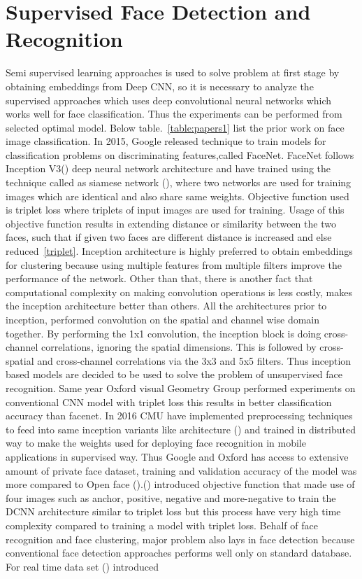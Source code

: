 \documentclass[a4paper,12pt, twoside]{NITKReport}
\begin{document}
\section{Supervised Face Detection and Recognition}
\par Semi supervised learning approaches is used to solve problem at first stage by obtaining embeddings from Deep CNN, so it is necessary to analyze the supervised approaches which uses deep convolutional neural networks which works well for face classification. Thus the experiments can be performed from selected optimal model. Below table.~\ref{table:papers1} list the prior work on face image classification. In 2015, Google released technique to train models for classification problems on discriminating features,called FaceNet. FaceNet follows Inception V3(\cite{DBLP:journals/corr/SzegedyVISW15}) deep neural network architecture and have trained using the technique called as siamese network (\cite{Koch2015SiameseNN}), where two networks are used for training images which are identical and also share same weights. Objective function used is triplet loss where triplets of input images are used for training. Usage of this objective function results in extending distance or similarity between the two faces, such that if given two faces are different distance is increased and else reduced~\ref{triplet}. Inception architecture is highly preferred to obtain embeddings for clustering because using multiple features from multiple filters improve the performance of the network. Other than that, there is another fact that computational complexity on making convolution operations is less costly, makes the inception architecture better than others. All the architectures prior to inception, performed convolution on the spatial and channel wise domain together. By performing the 1x1 convolution, the inception block is doing cross-channel correlations, ignoring the spatial dimensions. This is followed by cross-spatial and cross-channel correlations via the 3x3 and 5x5 filters. Thus inception based models are decided to be used to solve the problem of unsupervised face recognition. Same year Oxford visual Geometry Group performed experiments on conventional CNN model with triplet loss this results in better classification accuracy than facenet. In 2016 CMU have implemented preprocessing techniques to feed into same inception variants like architecture (\cite{amos2016openface}) and trained in distributed way to make the weights used for deploying face recognition in mobile applications in supervised way. Thus Google and Oxford has access to extensive amount of private face dataset, training and validation accuracy of the model was more compared to Open face (\cite{amos2016openface}).(\cite{chen2017beyond}) introduced objective function that made use of four images such as anchor, positive, negative and more-negative to train the DCNN architecture similar to triplet loss but this process have very high time complexity compared to training a model with triplet loss. Behalf of face recognition and face clustering, major problem also lays in face detection because conventional face detection approaches performs well only on standard database. For real time data set (\cite{zhang2016joint}) introduced 
\end{document}
